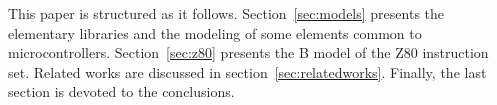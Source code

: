 \documentclass[a4paper]{llncs}
\begin{document}
%
% 

%

This paper is structured as it follows.  Section~\ref{sec:models}
presents the elementary libraries and the modeling of some elements
common to microcontrollers.  Section~\ref{sec:z80} presents the B
model of the Z80 instruction set.  Related works are discussed in
section~\ref{sec:relatedworks}. Finally, the last section is devoted
to the conclusions.
\end{document}
